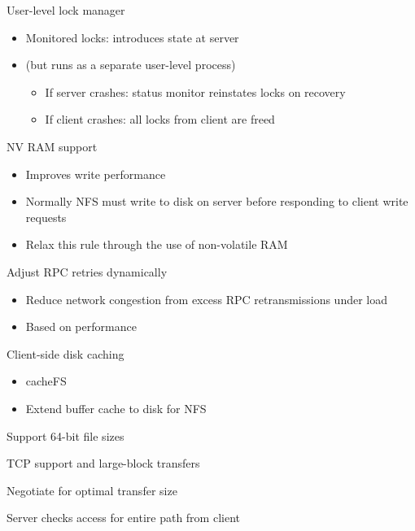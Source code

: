 \begin{slide}

	
	User-level lock manager
	\begin{itemize}
		\item Monitored locks: introduces state at server 
		\item (but runs as a separate user-level process) 
		\begin{itemize}
			\item If server crashes: status monitor reinstates locks on recovery
			\item If client crashes: all locks from client are freed 
		\end{itemize}
	\end{itemize}
	\medskip
	
	NV RAM support 
	\begin{itemize}
		\item Improves write performance 
		\item Normally NFS must write to disk on server before responding to client write requests 
		\item Relax this rule through the use of non-volatile RAM 
	\end{itemize}
	

\end{slide}

\begin{slide}

	
	Adjust RPC retries dynamically
	\begin{itemize}
		\item Reduce network congestion from excess RPC retransmissions under load 
		\item Based on performance
	\end{itemize}
	\medskip
	
	Client-side disk caching
	\begin{itemize}
		\item cacheFS
		\item Extend buffer cache to disk for NFS
	\end{itemize}

\end{slide}

\begin{slide}

	
	Support 64-bit file sizes
	\medskip
	
	TCP support and large-block transfers
	\medskip
	
	Negotiate for optimal transfer size
	\medskip
	
	Server checks access for entire path from client
	
\end{slide}


